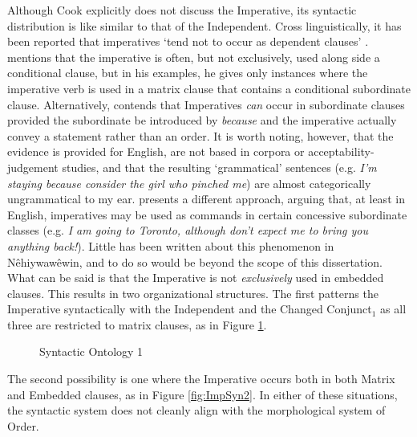 Although Cook explicitly does not discuss the Imperative, its syntactic distribution is like similar to that of the Independent. Cross linguistically, it has been reported that imperatives `tend not to occur as dependent clauses' \citep[174]{sadzw}. \citet{Wolfart1973} mentions that the imperative is often, but not exclusively, used along side a conditional clause, but in his examples, he gives only instances where the imperative verb is used in a matrix clause that contains a conditional subordinate clause. Alternatively, \citet[476]{Lakoff1984PerformativeSC} contends that Imperatives \textit{can} occur in subordinate clauses provided the subordinate be introduced by \textit{because} and the imperative actually convey a statement rather than an order. It is worth noting, however, that the evidence is provided for English, are not based in corpora or acceptability-judgement studies, and that the resulting `grammatical' sentences (e.g. \textit{I'm staying because consider the girl who pinched me}) are almost categorically ungrammatical to my ear. \citet{takahashi2008imperatives} presents a different approach, arguing that, at least in English, imperatives may be used as commands in certain concessive subordinate classes (e.g. \textit{I am going to Toronto, although don't expect me to bring you anything back!}). Little has been written about this phenomenon in Nêhiywawêwin, and to do so would be beyond the scope of this dissertation. What can be said is that the Imperative is not \textit{exclusively} used in embedded clauses. This results in two organizational structures. The first patterns the Imperative syntactically with the Independent and the Changed Conjunct$_{1}$ as all three are restricted to matrix clauses, as in Figure \ref{fig:ImpSyn1}.

\begin{figure}[h]
\centering
{}
\caption{Syntactic Ontology 1}
\label{fig:ImpSyn1}
\end{figure}

The second possibility is one where the Imperative occurs both in both Matrix and Embedded clauses, as in Figure \ref{fig:ImpSyn2}. In either of these situations, the syntactic system does not cleanly align with the morphological system of Order.

